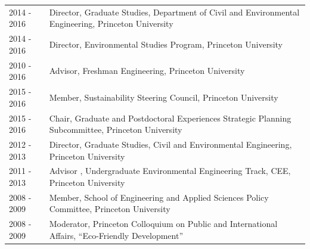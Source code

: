 \begin{longtable}{l p{5.5in}}
2014 - 2016 & Director, Graduate Studies, Department of Civil and Environmental Engineering, Princeton University  \\
2014 - 2016 & Director, Environmental Studies Program, Princeton University \\
2010 - 2016 & Advisor, Freshman Engineering, Princeton University \\
2015 - 2016 & Member, Sustainability Steering Council, Princeton University \\
2015 - 2016 & Chair, Graduate and Postdoctoral Experiences Strategic Planning Subcommittee, Princeton University \\
2012 - 2013 & Director, Graduate Studies, Civil and Environmental Engineering, Princeton University \\
2011 - 2013 & Advisor , Undergraduate Environmental Engineering Track, CEE, Princeton University \\
2008 - 2009 & Member, School of Engineering and Applied Sciences Policy Committee, Princeton University \\
2008 - 2009 & Moderator, Princeton Colloquium on Public and International Affairs, ``Eco-Friendly Development''  \\

\end{longtable}
